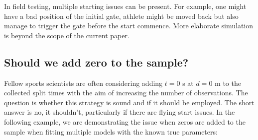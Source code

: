 \documentclass[fleqn,10pt,lineno]{wlpeerj} %
\begin{document}
In field testing, multiple starting issues can be present. For example, one might have a bad position of the initial gate, athlete might be moved back but also manage to trigger the gate before the start commence. More elaborate simulation is beyond the scope of the current paper.

\hypertarget{should-we-add-zero-to-the-sample}{%
\subsection{Should we add zero to the sample?}\label{should-we-add-zero-to-the-sample}}

Fellow sports scientists are often considering adding \(t=0\) s at \(d=0\) m to the collected split times with the aim of increasing the number of observations. The question is whether this strategy is sound and if it should be employed. The short answer is no, it shouldn't, particularly if there are flying start issues. In the following example, we are demonstrating the issue when zeros are added to the sample when fitting multiple models with the known true parameters:
\end{document}
